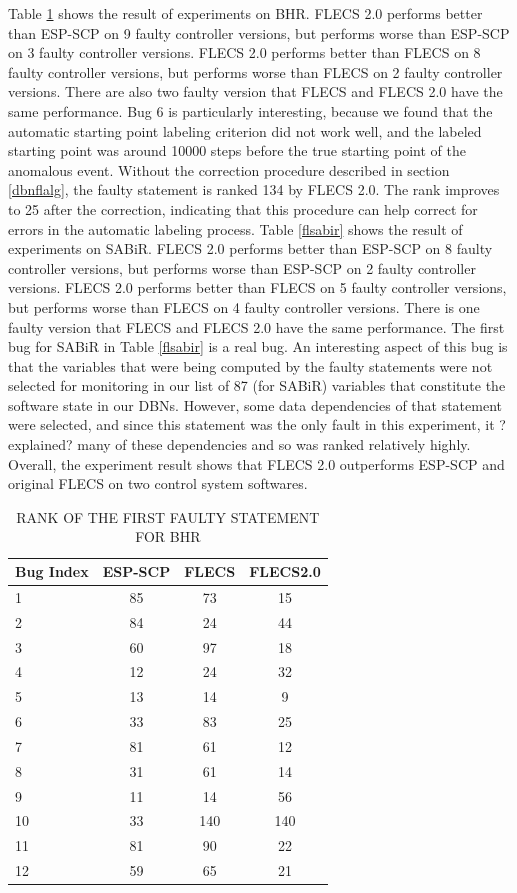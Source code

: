 Table \ref{flbhr} shows the result of experiments on BHR. FLECS 2.0 performs better than ESP-SCP on 9 faulty controller versions, but performs worse than ESP-SCP on 3 faulty controller versions.  FLECS 2.0 performs better than FLECS on 8 faulty controller versions, but performs worse than FLECS on 2 faulty controller versions. There are also two faulty version that FLECS and FLECS 2.0 have the same performance. Bug 6 is particularly interesting, because we found that the automatic starting point labeling criterion did not work well, and the labeled starting point was around 10000 steps before the true starting point of the anomalous event. Without the correction procedure described in section \ref{dbnflalg}, the faulty statement is ranked 134 by FLECS 2.0. The rank improves to 25 after the correction, indicating that this procedure can help correct for errors in the automatic labeling process. Table \ref{flsabir} shows the result of experiments on SABiR. FLECS 2.0 performs better than ESP-SCP on 8 faulty controller versions, but performs worse than ESP-SCP on 2 faulty controller versions.  FLECS 2.0 performs better than FLECS on 5 faulty controller versions, but performs worse than FLECS on 4 faulty controller versions. There is one faulty version that FLECS and FLECS 2.0 have the same performance. The first bug for SABiR in Table \ref{flsabir} is a real bug.  An interesting aspect of this bug is that the variables that were being computed by the faulty statements were not selected for monitoring in our list of 87 (for SABiR) variables that constitute the software state in our DBNs. However, some data dependencies of that statement were selected, and since this statement was the only fault in this experiment, it ?explained? many of these dependencies and so was ranked relatively highly. Overall, the experiment result shows that FLECS 2.0 outperforms ESP-SCP and original FLECS on two control system softwares. 

\begin{table}[htbp!]
\centering
\caption{RANK OF THE FIRST FAULTY STATEMENT FOR BHR}
\label{flbhr}
      \begin{tabular}{|l|c|c|c|}
      \hline
Bug Index	&	ESP-SCP	&	FLECS	&	FLECS2.0	\\ \hline
1	&	85	&	73	&	15	\\ \hline
2	&	84	&	24	&	44	\\ \hline
3	&	60	&	97	&	18	\\ \hline
4	&	12	&	24	&	32	\\ \hline
5	&	13	&	14	&	9	\\ \hline
6	&	33	&	83	&	25	\\ \hline
7	&	81	&	61	&	12	\\ \hline
8	&	31	&	61	&	14	\\ \hline
9	&	11	&	14	&	56	\\ \hline
10	&	33	&	140	&	140  \\ \hline
11	&	81	&	90	&	22	\\ \hline
12	&	59	&	65	&	21	\\ \hline
\end{tabular}
\end{table}

